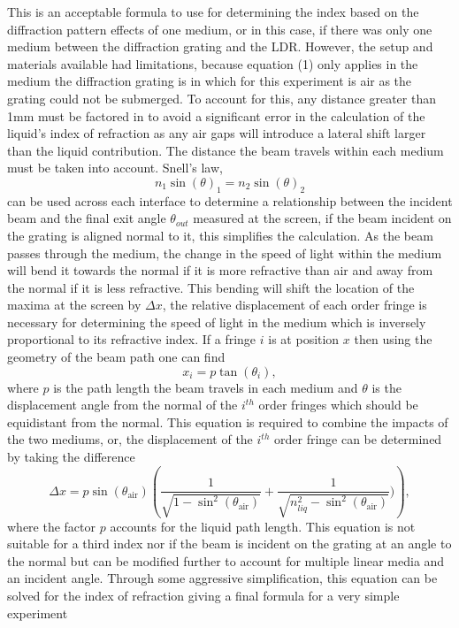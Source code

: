 \documentclass[11pt]{article}
\begin{document}
    This is an acceptable formula to use for determining the index based on
the diffraction pattern effects of one medium, or in this case, if there
was only one medium between the diffraction grating and the LDR.
However, the setup and materials available had limitations, because
equation (1) only applies in the medium the diffraction grating is in
which for this experiment is air as the grating could not be submerged.
To account for this, any distance greater than 1mm must be factored in
to avoid a significant error in the calculation of the liquid's index of
refraction as any air gaps will introduce a lateral shift larger than
the liquid contribution. The distance the beam travels within each
medium must be taken into account. Snell's law,
\[n_1 \sin(\theta)_1 = n_2 \sin(\theta)_2 \tag{6} \] can be used across
each interface to determine a relationship between the incident beam and
the final exit angle \(\theta_{out}\) measured at the screen, if the
beam incident on the grating is aligned normal to it, this simplifies
the calculation. As the beam passes through the medium, the change in
the speed of light within the medium will bend it towards the normal if
it is more refractive than air and away from the normal if it is less
refractive. This bending will shift the location of the maxima at the
screen by \(\Delta x\), the relative displacement of each order fringe
is necessary for determining the speed of light in the medium which is
inversely proportional to its refractive index. If a fringe \(i\) is at
position \(x\) then using the geometry of the beam path one can find
\[ x_i = p \tan (\theta_i), \tag{7}\] where \(p\) is the path length the
beam travels in each medium and \(\theta\) is the displacement angle
from the normal of the \(i^{th}\) order fringes which should be
equidistant from the normal. This equation is required to combine the
impacts of the two mediums, or, the displacement of the \(i^{th}\) order
fringe can be determined by taking the difference
\[ \Delta x = p \sin( \theta_{\text{air}} ) \left( \frac{1}{ \sqrt{1 - \sin^2 ( \theta_{\text{air}} ) }} + \frac{1}{ \sqrt{n_{liq}^2 - \sin^2 ( \theta_{\text{air}} ) }})\right) \tag{8},\]
where the factor \(p\) accounts for the liquid path length. This
equation is not suitable for a third index nor if the beam is incident
on the grating at an angle to the normal but can be modified further to
account for multiple linear media and an incident angle. Through some
aggressive simplification, this equation can be solved for the index of
refraction giving a final formula for a very simple experiment
\end{document}
